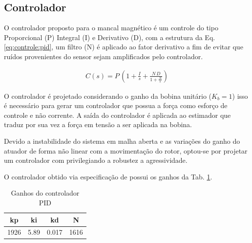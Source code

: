 \subsection{Controlador}

O controlador proposto para o mancal magnético é um controle do tipo Proporcional (P) Integral (I) e Derivativo (D), com a estrutura da Eq. \eqref{eq:controle:pid}, um filtro (N) é aplicado ao fator derivativo a fim de evitar que ruídos provenientes do sensor sejam amplificados pelo controlador.

\begin{align}
	C(s) = P \, \left( 1 + \frac{I}{s} + \frac{N \, D}{ 1 + \frac{N}{s}} \right)
	\label{eq:controle:pid}
\end{align}

O controlador é projetado considerando o ganho da bobina unitário ($K_b = 1$) isso é necessário para gerar um controlador que possua a força como esforço de controle e não corrente. A saída do controlador é aplicada ao estimador que traduz por sua vez a força em tensão a ser aplicada na bobina. 

Devido a instabilidade do sistema em malha aberta e as variações do ganho do atuador de forma não linear com a movimentação do rotor, optou-se por projetar um controlador com privilegiando a robustez a agressividade.

O controlador obtido via especificação de possui os ganhos da  Tab. \ref{tab:controle:pid}.

\begin{table}[ht!]
\centering
	\begin{tabular}{c c c c}
	 kp  &  ki & kd &  N  \\
	 \hline \hline
		1926	 &	5.89	& 0.017	&1616
	\end{tabular} 
	\caption{Ganhos do controlador PID}
	\label{tab:controle:pid}
\end{table}


